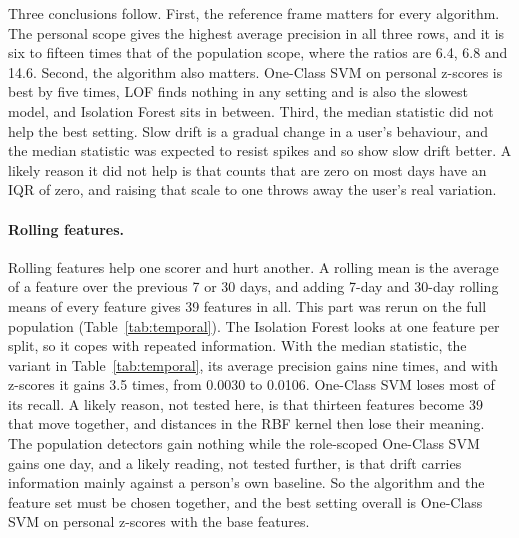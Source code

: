 \documentclass[a4paper,12pt]{article}
\begin{document}
Three conclusions follow. First, the reference frame matters for every algorithm. The personal scope gives the highest average precision in all three rows, and it is six to fifteen times that of the population scope, where the ratios are 6.4, 6.8 and 14.6. Second, the algorithm also matters. One-Class SVM on personal z-scores is best by five times, LOF finds nothing in any setting and is also the slowest model, and Isolation Forest sits in between. Third, the median statistic did not help the best setting. Slow drift is a gradual change in a user's behaviour, and the median statistic was expected to resist spikes and so show slow drift better. A likely reason it did not help is that counts that are zero on most days have an IQR of zero, and raising that scale to one throws away the user's real variation.

\paragraph{Rolling features.} Rolling features help one scorer and hurt another. A rolling mean is the average of a feature over the previous 7 or 30 days, and adding 7-day and 30-day rolling means of every feature gives 39 features in all. This part was rerun on the full population (Table~\ref{tab:temporal}). The Isolation Forest looks at one feature per split, so it copes with repeated information. With the median statistic, the variant in Table~\ref{tab:temporal}, its average precision gains nine times, and with z-scores it gains 3.5 times, from 0.0030 to 0.0106. One-Class SVM loses most of its recall. A likely reason, not tested here, is that thirteen features become 39 that move together, and distances in the RBF kernel then lose their meaning. The population detectors gain nothing while the role-scoped One-Class SVM gains one day, and a likely reading, not tested further, is that drift carries information mainly against a person's own baseline. So the algorithm and the feature set must be chosen together, and the best setting overall is One-Class SVM on personal z-scores with the base features.
\end{document}
